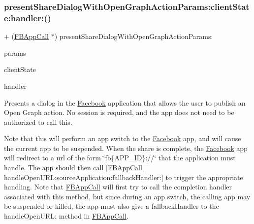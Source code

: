 \subsubsection{\texorpdfstring{present\+Share\+Dialog\+With\+Open\+Graph\+Action\+Params\+:client\+State\+:handler\+:()}{presentShareDialogWithOpenGraphActionParams:clientState:handler:()}\hspace{0.1cm}{\footnotesize\ttfamily [4/5]}}
{\footnotesize\ttfamily + (\hyperlink{interfaceFBAppCall}{F\+B\+App\+Call} $\ast$) present\+Share\+Dialog\+With\+Open\+Graph\+Action\+Params\+: \begin{DoxyParamCaption}\item[{(\hyperlink{interfaceFBOpenGraphActionParams}{F\+B\+Open\+Graph\+Action\+Params} $\ast$)}]{params }\item[{clientState:(N\+S\+Dictionary $\ast$)}]{client\+State }\item[{handler:(F\+B\+Dialog\+App\+Call\+Completion\+Handler)}]{handler }\end{DoxyParamCaption}}

Presents a dialog in the \hyperlink{interfaceFacebook}{Facebook} application that allows the user to publish an Open Graph action. No session is required, and the app does not need to be authorized to call this.

Note that this will perform an app switch to the \hyperlink{interfaceFacebook}{Facebook} app, and will cause the current app to be suspended. When the share is complete, the \hyperlink{interfaceFacebook}{Facebook} app will redirect to a url of the form \char`\"{}fb\{\+A\+P\+P\+\_\+\+I\+D\}\+://\char`\"{} that the application must handle. The app should then call \mbox{[}\hyperlink{interfaceFBAppCall}{F\+B\+App\+Call} handle\+Open\+U\+R\+L\+:source\+Application\+:fallback\+Handler\+:\mbox{]} to trigger the appropriate handling. Note that \hyperlink{interfaceFBAppCall}{F\+B\+App\+Call} will first try to call the completion handler associated with this method, but since during an app switch, the calling app may be suspended or killed, the app must also give a fallback\+Handler to the handle\+Open\+U\+RL\+: method in \hyperlink{interfaceFBAppCall}{F\+B\+App\+Call}.


